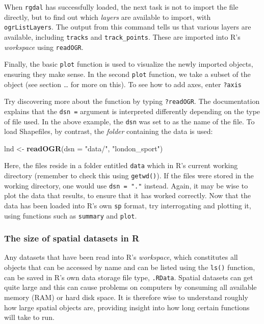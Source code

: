 \documentclass[]{article}
\newenvironment{Shaded}{}{}
\newcommand{\KeywordTok}[1]{\textcolor[rgb]{0.00,0.44,0.13}{\textbf{{#1}}}}
\newcommand{\DataTypeTok}[1]{\textcolor[rgb]{0.56,0.13,0.00}{{#1}}}
\newcommand{\StringTok}[1]{\textcolor[rgb]{0.25,0.44,0.63}{{#1}}}
\newcommand{\NormalTok}[1]{{#1}}
\begin{document}
When \texttt{rgdal} has successfully loaded, the next task is not to
import the file directly, but to find out which \emph{layers} are
available to import, with \texttt{ogrListLayers}. The output from this
command tells us that various layers are available, including
\texttt{tracks} and \texttt{track\_points}. These are imported into R's
\emph{workspace} using \texttt{readOGR}.

Finally, the basic \texttt{plot} function is used to visualize the newly
imported objects, ensuring they make sense. In the second \texttt{plot}
function, we take a subset of the object (see section \ldots{} for more
on this). To see how to add axes, enter \texttt{?axis}

Try discovering more about the function by typing \texttt{?readOGR}. The
documentation explains that the \texttt{dsn =} argument is interpreted
differently depending on the type of file used. In the above example,
the \texttt{dsn} was set to as the name of the file. To load Shapefiles,
by contrast, the \emph{folder} containing the data is used:

\begin{Shaded}
\begin{Highlighting}[]
\NormalTok{lnd <- }\KeywordTok{readOGR}\NormalTok{(}\DataTypeTok{dsn =} \StringTok{"data/"}\NormalTok{, }\StringTok{"london_sport"}\NormalTok{)}
\end{Highlighting}
\end{Shaded}
Here, the files reside in a folder entitled \texttt{data} which in R's
current working directory (remember to check this using
\texttt{getwd()}). If the files were stored in the working directory,
one would use \texttt{dsn = "."} instead. Again, it may be wise to plot
the data that results, to ensure that it has worked correctly. Now that
the data has been loaded into R's own \texttt{sp} format, try
interrogating and plotting it, using functions such as \texttt{summary}
and \texttt{plot}.

\subsubsection{The size of spatial datasets in R}

Any datasets that have been read into R's \emph{workspace}, which
constitutes all objects that can be accessed by name and can be listed
using the \texttt{ls()} function, can be saved in R's own data storage
file type, \texttt{.RData}. Spatial datasets can get quite large and
this can cause problems on computers by consuming all available memory
(RAM) or hard disk space. It is therefore wise to understand roughly how
large spatial objects are, providing insight into how long certain
functions will take to run.
\end{document}
